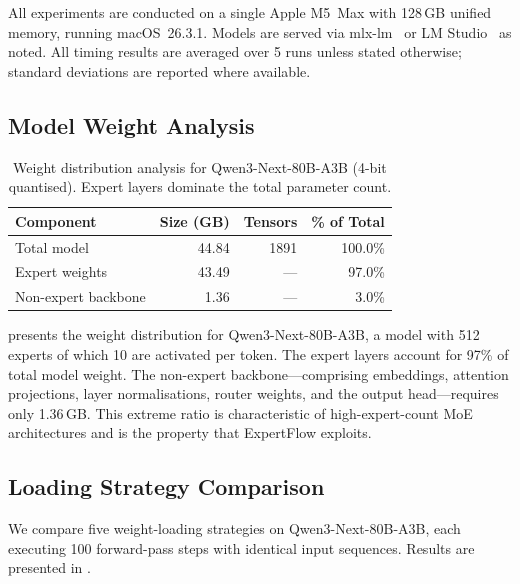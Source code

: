 \documentclass[11pt,a4paper]{article}
\begin{document}
All experiments are conducted on a single Apple M5~Max with 128\,GB unified
memory, running macOS~26.3.1. Models are served via mlx-lm~\citep{mlx2023}
or LM Studio~\citep{lmstudio} as noted. All timing results are averaged
over 5 runs unless stated otherwise; standard deviations are reported where
available.

\subsection{Model Weight Analysis}
\label{sec:experiments:analysis}

\begin{table}[t]
\centering
\caption{Weight distribution analysis for Qwen3-Next-80B-A3B (4-bit
  quantised). Expert layers dominate the total parameter count.}
\label{tab:weight-analysis}
\begin{tabular}{lrrr}
\toprule
\textbf{Component} & \textbf{Size (GB)} & \textbf{Tensors} &
  \textbf{\% of Total} \\
\midrule
Total model          & 44.84 & 1891 & 100.0\% \\
Expert weights       & 43.49 &  --- &  97.0\% \\
Non-expert backbone  &  1.36 &  --- &   3.0\% \\
\bottomrule
\end{tabular}
\end{table}

 presents the weight distribution for
Qwen3-Next-80B-A3B, a model with 512 experts of which 10 are activated per
token. The expert layers account for 97\% of total model weight. The non-expert
backbone---comprising embeddings, attention projections, layer normalisations,
router weights, and the output head---requires only 1.36\,GB. This extreme
ratio is characteristic of high-expert-count MoE architectures and is the
property that ExpertFlow exploits.

\subsection{Loading Strategy Comparison}
\label{sec:experiments:loading}

We compare five weight-loading strategies on Qwen3-Next-80B-A3B, each
executing 100 forward-pass steps with identical input sequences. Results are
presented in .
\end{document}
